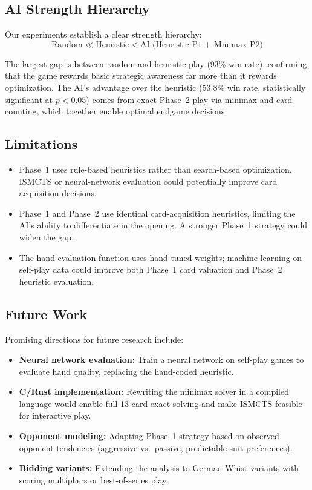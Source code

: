 \subsection{AI Strength Hierarchy}

Our experiments establish a clear strength hierarchy:
\[
  \text{Random} \ll \text{Heuristic} < \text{AI (Heuristic P1 + Minimax P2)}
\]

The largest gap is between random and heuristic play (93\% win rate),
confirming that the game rewards basic strategic awareness far more than
it rewards optimization. The AI's advantage over the heuristic (53.8\% win
rate, statistically significant at $p < 0.05$) comes from exact Phase~2
play via minimax and card counting, which together enable optimal endgame
decisions.

\subsection{Limitations}

\begin{itemize}
  \item Phase~1 uses rule-based heuristics rather than search-based
    optimization. ISMCTS or neural-network evaluation could potentially
    improve card acquisition decisions.
  \item Phase~1 and Phase~2 use identical card-acquisition heuristics,
    limiting the AI's ability to differentiate in the opening. A stronger
    Phase~1 strategy could widen the gap.
  \item The hand evaluation function uses hand-tuned weights; machine
    learning on self-play data could improve both Phase~1 card valuation
    and Phase~2 heuristic evaluation.
\end{itemize}

\subsection{Future Work}

Promising directions for future research include:
\begin{itemize}
  \item \textbf{Neural network evaluation:} Train a neural network on
    self-play games to evaluate hand quality, replacing the hand-coded
    heuristic.
  \item \textbf{C/Rust implementation:} Rewriting the minimax solver in a
    compiled language would enable full 13-card exact solving and make ISMCTS
    feasible for interactive play.
  \item \textbf{Opponent modeling:} Adapting Phase~1 strategy based on
    observed opponent tendencies (aggressive vs.\ passive, predictable suit
    preferences).
  \item \textbf{Bidding variants:} Extending the analysis to German Whist
    variants with scoring multipliers or best-of-series play.
\end{itemize}
